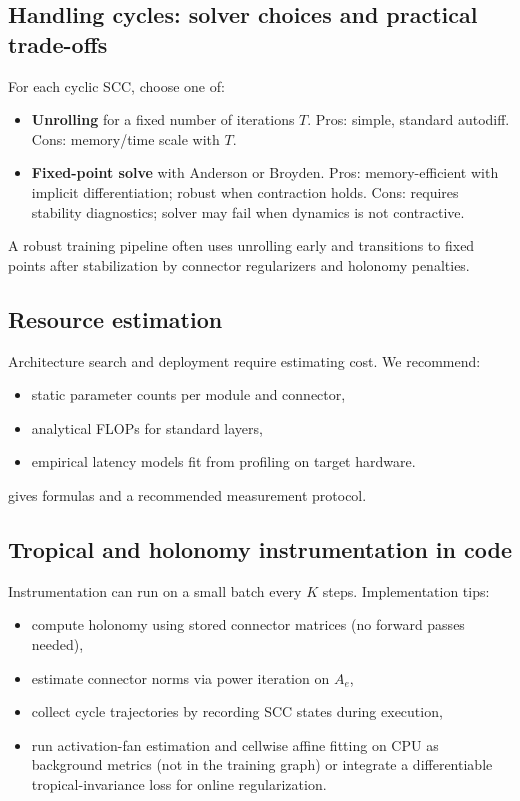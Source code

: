 \documentclass[11pt]{article}
\theoremstyle{definition}
\theoremstyle{plain}
\theoremstyle{remark}
\begin{document}
\subsection{Handling cycles: solver choices and practical trade-offs}
\label{sec:cycle-impl}

For each cyclic SCC, choose one of:
\begin{itemize}[leftmargin=2em]
\item \textbf{Unrolling} for a fixed number of iterations $T$.
Pros: simple, standard autodiff. Cons: memory/time scale with $T$.
\item \textbf{Fixed-point solve} with Anderson or Broyden.
Pros: memory-efficient with implicit differentiation; robust when contraction holds.
Cons: requires stability diagnostics; solver may fail when dynamics is not contractive.
\end{itemize}
A robust training pipeline often uses unrolling early and transitions to fixed points after stabilization by connector regularizers and holonomy penalties.

\subsection{Resource estimation}
Architecture search and deployment require estimating cost.
We recommend:
\begin{itemize}[leftmargin=2em]
\item static parameter counts per module and connector,
\item analytical FLOPs for standard layers,
\item empirical latency models fit from profiling on target hardware.
\end{itemize}
 gives formulas and a recommended measurement protocol.

\subsection{Tropical and holonomy instrumentation in code}
\label{sec:instrument-code}

Instrumentation can run on a small batch every $K$ steps.
Implementation tips:
\begin{itemize}[leftmargin=2em]
\item compute holonomy using stored connector matrices (no forward passes needed),
\item estimate connector norms via power iteration on $A_e$,
\item collect cycle trajectories by recording SCC states during execution,
\item run activation-fan estimation and cellwise affine fitting on CPU as background metrics (not in the training graph) or integrate a differentiable tropical-invariance loss for online regularization.
\end{itemize}
\end{document}
